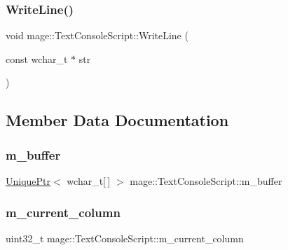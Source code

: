 \subsubsection{\texorpdfstring{Write\+Line()}{WriteLine()}}
{\footnotesize\ttfamily void mage\+::\+Text\+Console\+Script\+::\+Write\+Line (\begin{DoxyParamCaption}\item[{const wchar\+\_\+t $\ast$}]{str }\end{DoxyParamCaption})}



\subsection{Member Data Documentation}
\hypertarget{classmage_1_1_text_console_script_a526410b1b43646948809b772c5446346}{}\label{classmage_1_1_text_console_script_a526410b1b43646948809b772c5446346} 
\subsubsection{\texorpdfstring{m\+\_\+buffer}{m\_buffer}}
{\footnotesize\ttfamily \hyperlink{namespacemage_a8c307fbcc33bce9b7f2aa4c26c3b95cf}{Unique\+Ptr}$<$ wchar\+\_\+t\mbox{[}$\,$\mbox{]} $>$ mage\+::\+Text\+Console\+Script\+::m\+\_\+buffer\hspace{0.3cm}{\ttfamily [private]}}

\hypertarget{classmage_1_1_text_console_script_ac08f796712a2dc5d6e78a3f558272dff}{}\label{classmage_1_1_text_console_script_ac08f796712a2dc5d6e78a3f558272dff} 
\subsubsection{\texorpdfstring{m\+\_\+current\+\_\+column}{m\_current\_column}}
{\footnotesize\ttfamily uint32\+\_\+t mage\+::\+Text\+Console\+Script\+::m\+\_\+current\+\_\+column\hspace{0.3cm}{\ttfamily [private]}}

\hypertarget{classmage_1_1_text_console_script_aedb5aebdee16791c69e0143525ee9d10}{}\label{classmage_1_1_text_console_script_aedb5aebdee16791c69e0143525ee9d10} 
